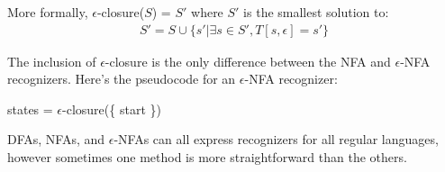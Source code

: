 \documentclass[]{article}
\theoremstyle{definition}
\begin{document}
			More formally, $\epsilon$-closure($S$) = $S'$ where $S'$ is the smallest solution to:
			\begin{align*}
				S' = S \cup \{s' | \exists s \in S', T[s, \epsilon] = s'\}
			\end{align*}

			The inclusion of $\epsilon$-closure is the only difference between the NFA and $\epsilon$-NFA recognizers. Here's the pseudocode for an $\epsilon$-NFA recognizer: \\
			\begin{algorithm}[H]
				states = $\epsilon$-closure(\{ start \})\;
			\end{algorithm}

			DFAs, NFAs, and $\epsilon$-NFAs can all express recognizers for all regular languages, however sometimes one method is more straightforward than the others.
\end{document}
